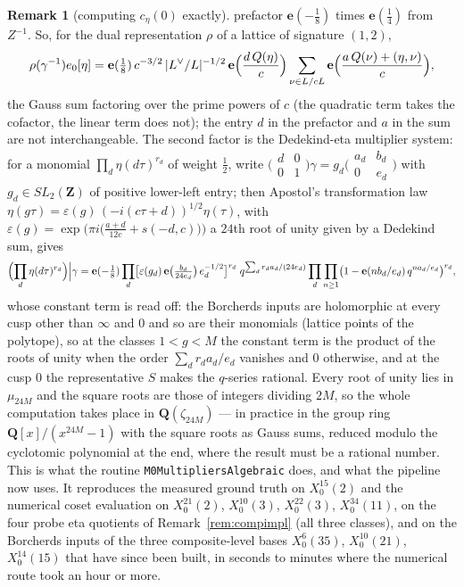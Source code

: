 \documentclass[11pt,reqno]{amsart}
\theoremstyle{plain}
\theoremstyle{definition}
\newtheorem{remark}[theorem]{Remark}
\newcommand{\Ldual}{L^{\vee}}
\begin{document}
\begin{remark}[computing $c_\eta(0)$ exactly]
prefactor $\mathbf e(-\tfrac18)$ times $\mathbf e(\tfrac14)$ from $Z^{-1}$. So, for the dual
representation $\rho$ of a lattice of signature $(1,2)$,
\[
\rho(\gamma^{-1})e_0[\eta]=\mathbf e(\tfrac18)\,c^{-3/2}\,\lvert\Ldual/L\rvert^{-1/2}\,
\mathbf e\Bigl(\frac{d\,Q(\eta)}c\Bigr)\sum_{\nu\in L/cL}\mathbf e\Bigl(\frac{a\,Q(\nu)+(\eta,\nu)}c\Bigr),
\]
the Gauss sum factoring over the prime powers of $c$ (the quadratic term takes the cofactor, the
linear term does not); the entry $d$ in the prefactor and $a$ in the sum are not interchangeable.
The second factor is the Dedekind-eta multiplier system: for a monomial $\prod_d\eta(d\tau)^{r_d}$
of weight $\tfrac12$, write $\bigl(\begin{smallmatrix}d&0\\0&1\end{smallmatrix}\bigr)\gamma=g_d
\bigl(\begin{smallmatrix}a_d&b_d\\0&e_d\end{smallmatrix}\bigr)$ with $g_d\in SL_2(\mathbf Z)$ of
positive lower-left entry; then Apostol's transformation law $\eta(g\tau)=\varepsilon(g)\,
(-i(c\tau+d))^{1/2}\eta(\tau)$, with $\varepsilon(g)=\exp\bigl(\pi i\bigl(\frac{a+d}{12c}+s(-d,c)
\bigr)\bigr)$ a $24$th root of unity given by a Dedekind sum, gives
\[
\Bigl(\prod_d\eta(d\tau)^{r_d}\Bigr)\Big|\gamma
=\mathbf e(-\tfrac18)\prod_d\bigl[\varepsilon(g_d)\,\mathbf e\bigl(\tfrac{b_d}{24e_d}\bigr)\,
e_d^{-1/2}\bigr]^{r_d}\;q^{\sum_d r_da_d/(24e_d)}\prod_d\prod_{n\ge1}
\bigl(1-\mathbf e(nb_d/e_d)\,q^{na_d/e_d}\bigr)^{r_d},
\]
whose constant term is read off: the Borcherds inputs are holomorphic at every cusp other than
$\infty$ and $0$ and so are their monomials (lattice points of the polytope), so at the classes
$1<g<M$ the constant term is the product of the roots of unity when the order $\sum_dr_da_d/e_d$
vanishes and $0$ otherwise, and at the cusp $0$ the representative $S$ makes the $q$-series rational.
Every root of unity lies in $\mu_{24M}$ and the square roots are those of integers dividing $2M$, so
the whole computation takes place in $\mathbf Q(\zeta_{24M})$ --- in practice in the group ring
$\mathbf Q[x]/(x^{24M}-1)$ with the square roots as Gauss sums, reduced modulo the cyclotomic
polynomial at the end, where the result must be a rational number. This is what the routine
\texttt{M0MultipliersAlgebraic} does, and what the pipeline now uses. It reproduces the measured
ground truth on $X_0^{15}(2)$ and the numerical coset evaluation on $X_0^{21}(2)$, $X_0^{10}(3)$,
$X_0^{22}(3)$, $X_0^{34}(11)$, on the four probe eta quotients of Remark~\ref{rem:compimpl}
(all three classes), and on the Borcherds inputs of the three composite-level bases $X_0^6(35)$,
$X_0^{10}(21)$, $X_0^{14}(15)$ that have since been built, in seconds to minutes where the numerical
route took an hour or more.
\end{remark}
\end{document}
